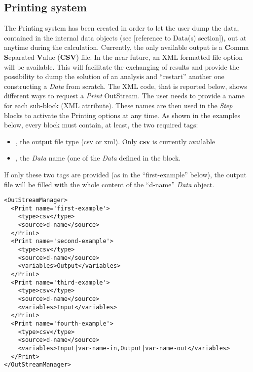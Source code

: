 \subsection{Printing system \label{sec:printing}}
The Printing system has been created in order to let the user dump the data,
contained in the internal data objects (see [reference to Data(s) section]), out
at anytime during the calculation.
%
Currently, the only available output is a \textbf{C}omma \textbf{S}eparated
\textbf{V}alue (\textbf{CSV}) file.
%
In the near future, an XML formatted file option will be available.
%
This will facilitate the exchanging of results and provide the possibility to
dump the solution of an analysis and ``restart'' another one constructing a
\textit{Data} from scratch.
%
The XML code, that is reported below, shows different ways to request a
\textit{Print} OutStream.
%
The user needs to provide a name for each sub-block (XML attribute).
%
These names are then used in the \textit{Step} blocks to activate the Printing
options at any time.
%
As shown in the examples below, every  block must contain, at
least, the two required tags:
\vspace{-5mm}
\begin{itemize}
  \itemsep0em
  \item {}, the output file type (csv or xml).
  \nb Only \textbf{csv} is currently available
  \item {}, the \textit{Data} name (one of the \textit{Data} 
  defined in the  block.
\end{itemize}
\vspace{-5mm}
If only these two tags are provided (as in the ``first-example'' below), the
output file will be filled with the whole content of the ``d-name''
\textit{Data} object.
%
\begin{lstlisting}[style=XML]
<OutStreamManager>
  <Print name='first-example'>
    <type>csv</type>
    <source>d-name</source>
  </Print>
  <Print name='second-example'>
    <type>csv</type>
    <source>d-name</source>
    <variables>Output</variables>
  </Print>
  <Print name='third-example'>
    <type>csv</type>
    <source>d-name</source>
    <variables>Input</variables>
  </Print>
  <Print name='fourth-example'>
    <type>csv</type>
    <source>d-name</source>
    <variables>Input|var-name-in,Output|var-name-out</variables>
  </Print>
</OutStreamManager>
\end{lstlisting}

